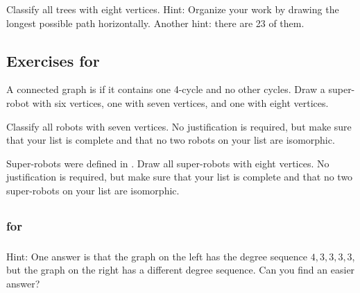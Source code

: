 \begin{exer}[\exerE] %
\label{exer_classify_trees_order8}
    Classify all trees with eight vertices. Hint: Organize your work by drawing the longest possible path horizontally. Another hint: there are 23 of them. 
\end{exer}

\subsection*{Exercises for  \subrobots}

\begin{exer}[\exerP] %
\label{exer_super_robot}
    A connected graph is  if it contains one 4-cycle and no other cycles.  Draw a super-robot with six vertices, one with seven vertices, and one with eight vertices.
\end{exer}

\begin{exer}[\exerE] %
\label{exer_robots7}
    Classify all robots with seven vertices. No justification is required, but make sure that your list is complete and that no two robots on your list are isomorphic.
\end{exer}

\begin{exer}[\exerE] %
\label{exer_super_robot8}
    Super-robots were defined in . Draw all super-robots with eight vertices. No justification is required, but make sure that your list is complete and that no two super-robots on your list are isomorphic.
\end{exer}

\subsection{\answers}

\subsubsection{\answers for  \subnonisograph}

\subsubsection*{ \answers}
    Hint:  One answer is that the graph on the left has the degree sequence $4,3,3,3,3$, but the graph on the right has a different degree sequence.  Can you find an easier answer?

